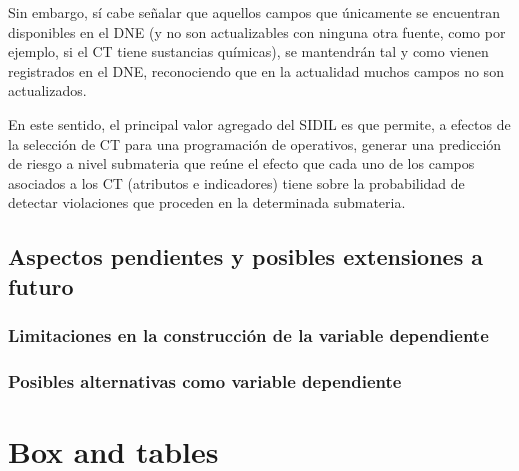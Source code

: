 \documentclass[
]{article}
\begin{document}
Sin embargo, sí cabe señalar que aquellos campos que únicamente se encuentran disponibles en el DNE (y no son actualizables con ninguna otra fuente, como por ejemplo, si el CT tiene sustancias químicas), se mantendrán tal y como vienen registrados en el DNE, reconociendo que en la actualidad muchos campos no son actualizados.

En este sentido, el principal valor agregado del SIDIL es que permite, a efectos de la selección de CT para una programación de operativos, generar una predicción de riesgo a nivel submateria que reúne el efecto que cada uno de los campos asociados a los CT (atributos e indicadores) tiene sobre la probabilidad de detectar violaciones que proceden en la determinada submateria.

\hypertarget{aspectos-pendientes-y-posibles-extensiones-a-futuro}{%
\subsection{Aspectos pendientes y posibles extensiones a futuro}\label{aspectos-pendientes-y-posibles-extensiones-a-futuro}}

\hypertarget{limitaciones-en-la-construcciuxf3n-de-la-variable-dependiente}{%
\subsubsection{Limitaciones en la construcción de la variable dependiente}\label{limitaciones-en-la-construcciuxf3n-de-la-variable-dependiente}}

\hypertarget{posibles-alternativas-como-variable-dependiente}{%
\subsubsection{Posibles alternativas como variable dependiente}\label{posibles-alternativas-como-variable-dependiente}}

\hypertarget{section}{%
\subsubsection{}\label{section}}

\hypertarget{box-and-tables}{%
\section{Box and tables}\label{box-and-tables}}
\end{document}
